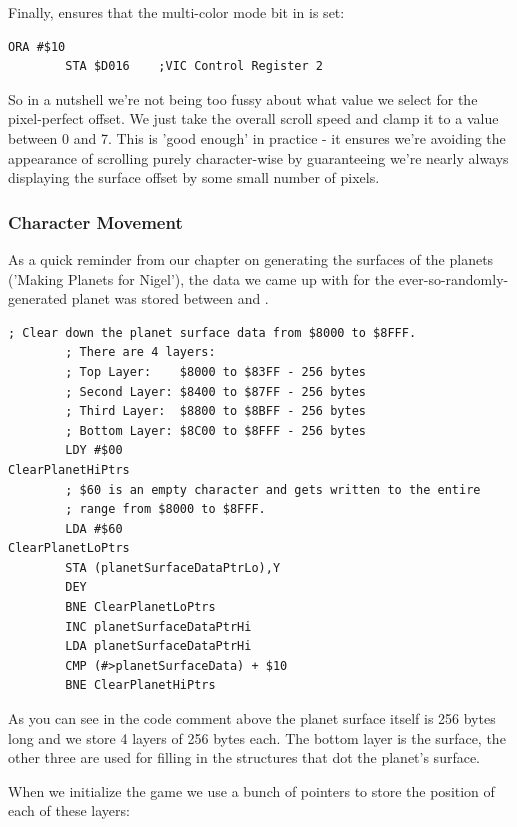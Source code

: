 Finally,  ensures that the multi-color mode bit in  is set:

\begin{lstlisting}[]
        ORA #$10
        STA $D016    ;VIC Control Register 2
\end{lstlisting}

So in a nutshell we're not being too fussy about what value we select for the pixel-perfect offset. We
just take the overall scroll speed and clamp it to a value between 0 and 7. This is 'good enough' in 
practice - it ensures we're avoiding the appearance of scrolling purely character-wise by guaranteeing
we're nearly always displaying the surface offset by some small number of pixels.

\subsubsection{Character Movement}

As a quick reminder from our chapter on generating the surfaces of the planets ('Making Planets for Nigel'),
the data we came up with for the ever-so-randomly-generated planet was stored between  and .

\begin{lstlisting}[caption=The surface data is stored from \icode{\$8000} to \icode{\$8FFF}. This code overwrites it all with 
the value \$60\, which is an empty bitmap.]
        ; Clear down the planet surface data from $8000 to $8FFF.
        ; There are 4 layers:
        ; Top Layer:    $8000 to $83FF - 256 bytes 
        ; Second Layer: $8400 to $87FF - 256 bytes 
        ; Third Layer:  $8800 to $8BFF - 256 bytes 
        ; Bottom Layer: $8C00 to $8FFF - 256 bytes 
        LDY #$00
ClearPlanetHiPtrs   
        ; $60 is an empty character and gets written to the entire
        ; range from $8000 to $8FFF.
        LDA #$60
ClearPlanetLoPtrs   
        STA (planetSurfaceDataPtrLo),Y
        DEY
        BNE ClearPlanetLoPtrs
        INC planetSurfaceDataPtrHi
        LDA planetSurfaceDataPtrHi
        CMP (#>planetSurfaceData) + $10
        BNE ClearPlanetHiPtrs
\end{lstlisting}

As you can see in the code comment above the planet surface itself is 256 bytes long and we store 4 layers of 256
bytes each. The bottom layer is the surface, the other three are used for filling in the structures that dot the
planet's surface.

When we initialize the game we use a bunch of pointers to store the position of each of these layers:

